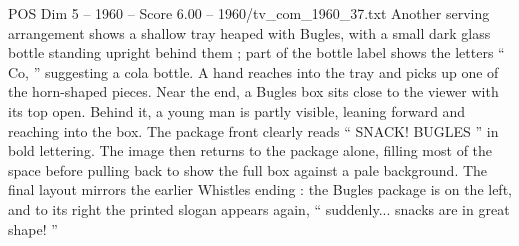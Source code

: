 \begin{textsample}{POS Dim 5 – 1960 – Score 6.00 – 1960/tv\_com\_1960\_37.txt}
Another serving arrangement shows a shallow tray heaped with Bugles, with a small dark glass bottle standing upright behind them ; part of the bottle label shows the letters “ Co, ” suggesting a cola bottle.
A hand reaches into the tray and picks up one of the horn-shaped pieces.
Near the end, a Bugles box sits close to the viewer with its top open.
Behind it, a young man is partly visible, leaning forward and reaching into the box.
The package front clearly reads “ SNACK!
BUGLES ” in bold lettering.
The image then returns to the package alone, filling most of the space before pulling back to show the full box against a pale background.
The final layout mirrors the earlier Whistles ending : the Bugles package is on the left, and to its right the printed slogan appears again, “ suddenly... snacks are in great shape! ”

\end{textsample}

